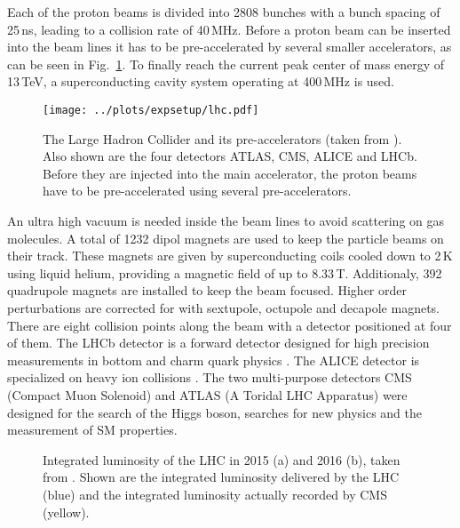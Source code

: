 \noindent Each of the proton beams is divided into 2808 bunches with a bunch spacing of 25\,ns, leading to a collision rate of 40\,MHz. Before a proton beam can be inserted into the beam lines it has to be pre-accelerated by several smaller accelerators, as can be seen in Fig.~\ref{fig:expsetup:lhc}. To finally reach the current peak center of mass energy of 13\,TeV, a superconducting cavity system operating at 400\,MHz is used.\\
\begin{figure}[t]
	\centering
	\texttt{[image: ../plots/expsetup/lhc.pdf]}
	\caption[The Large Hadron Collider]{The Large Hadron Collider and its pre-accelerators (taken from \cite{lhc_fig}). Also shown are the four detectors ATLAS, CMS, ALICE and LHCb. Before they are injected into the main accelerator, the proton beams have to be pre-accelerated using several pre-accelerators.}
	\label{fig:expsetup:lhc}
\end{figure}

\noindent An ultra high vacuum is needed inside the beam lines to avoid scattering on gas molecules. A total of 1232 dipol magnets are used to keep the particle beams on their track. These magnets are given by superconducting coils cooled down to 2\,K using liquid helium, providing a magnetic field of up to 8.33\,T. Additionaly, 392 quadrupole magnets are installed to keep the beam focused. Higher order perturbations are corrected for with sextupole, octupole and decapole magnets.\\

\noindent There are eight collision points along the beam with a detector positioned at four of them. The LHCb detector is a forward detector designed for high precision measurements in bottom and charm quark physics \cite{LHCB}. The ALICE detector is specialized on heavy ion collisions \cite{ALICE}. The two multi-purpose detectors CMS (Compact Muon Solenoid) and ATLAS (A Toridal LHC Apparatus) were designed for the search of the Higgs boson, searches for new physics and the measurement of SM properties.\\

\begin{figure}
	\centering
	\begin{minipage}{0.5\textwidth}
	\end{minipage}%
	\begin{minipage}{0.5\textwidth}
	\end{minipage}
	\caption[Integrated luminosity of the LHC in 2015 and 2016]{Integrated luminosity of the LHC in 2015 (a) and 2016 (b), taken from 	\cite{cmslumi}. Shown are the integrated luminosity delivered by the LHC (blue) and the integrated luminosity actually recorded by CMS (yellow).}
\end{figure}

